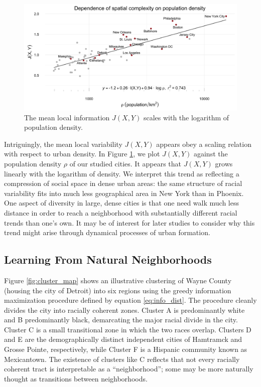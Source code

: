 	
	\begin{figure}
		\includegraphics[width=1\textwidth]{figs/density_fisher.png}
		\caption{The mean local information $J(X,Y)$ scales with the logarithm of population density.}
		\label{fig:density}
	\end{figure}	

	Intriguingly, the mean local variability $J(X,Y)$ appears obey a scaling relation with respect to urban density. In Figure \ref{fig:density}, we plot $J(X,Y)$ against the population density $\rho$ of our studied cities. It appears that $J(X,Y)$ grows linearly with the logarithm of density. We interpret this trend as reflecting a compression of social space in dense urban areas: the same structure of racial variability fits into much less geographical area in New York than in Phoenix. One aspect of diversity in large, dense cities is that one need walk much less distance in order to reach a neighborhood with substantially different racial trends than one's own. It may be of interest for later studies to consider why this trend might arise through dynamical processes of urban formation. 
	 
\subsection*{Learning From Natural Neighborhoods}

	Figure \ref{fig:cluster_map} shows an illustrative clustering of Wayne County (housing the city of Detroit) into six regions using the greedy information maximization procedure defined by equation \eqref{eq:info_dist}. The procedure cleanly divides the city into racially coherent zones. Cluster A is predominantly white and B predominantly black, demarcating the major racial divide in the city. Cluster C is a small transitional zone in which the two races overlap. Clusters D and E are the demographically distinct independent cities of Hamtramck and Grosse Pointe, respectively, while Cluster F is a Hispanic community known as Mexicantown. The existence of clusters like C reflects that not every racially coherent tract is interpretable as a ``neighborhood''; some may be more naturally thought as transitions between neighborhoods. 
	

